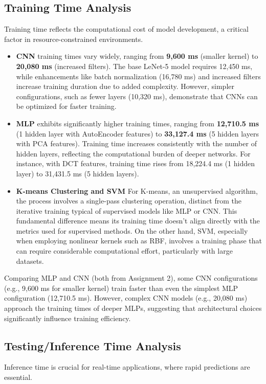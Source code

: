 \documentclass[a4paper,12pt]{article}
\begin{document}
\subsection{Training Time Analysis}
Training time reflects the computational cost of model development, a critical factor in resource-constrained environments.

\begin{itemize}
    \item \textbf{CNN} training times vary widely, ranging from \textbf{9,600 ms} (smaller kernel) to \textbf{20,080 ms} (increased filters). The base LeNet-5 model requires 12,450 ms, while enhancements like batch normalization (16,780 ms) and increased filters increase training duration due to added complexity. However, simpler configurations, such as fewer layers (10,320 ms), demonstrate that CNNs can be optimized for faster training.
    
    \item \textbf{MLP} exhibits significantly higher training times, ranging from \textbf{12,710.5 ms} (1 hidden layer with AutoEncoder features) to \textbf{33,127.4 ms} (5 hidden layers with PCA features). Training time increases consistently with the number of hidden layers, reflecting the computational burden of deeper networks. For instance, with DCT features, training time rises from 18,224.4 ms (1 hidden layer) to 31,431.5 ms (5 hidden layers).
    
    \item \textbf{K-means Clustering and SVM} For K-means, an unsupervised algorithm, the process involves a single-pass clustering operation, distinct from the iterative training typical of supervised models like MLP or CNN. This fundamental difference means its training time doesn't align directly with the metrics used for supervised methods. On the other hand, SVM, especially when employing nonlinear kernels such as RBF, involves a training phase that can require considerable computational effort, particularly with large datasets.\\
\end{itemize}
Comparing MLP and CNN (both from Assignment 2), some CNN configurations (e.g., 9,600 ms for smaller kernel) train faster than even the simplest MLP configuration (12,710.5 ms). However, complex CNN models (e.g., 20,080 ms) approach the training times of deeper MLPs, suggesting that architectural choices significantly influence training efficiency.

\subsection{Testing/Inference Time Analysis}
Inference time is crucial for real-time applications, where rapid predictions are essential.
\end{document}
